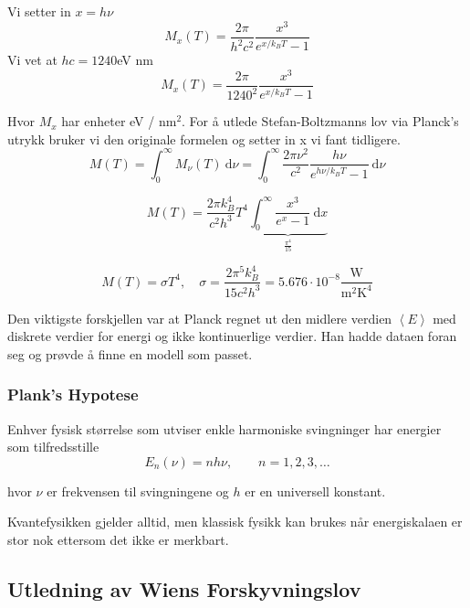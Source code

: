Vi setter in $x = hν$
\begin{equation}
M_{x}(T) = \frac{2π}{h^{2}c^{2}} \frac{x^{3}}{e^{x/k_{B}T} - 1}
\end{equation}
Vi vet at $hc = 1240 $eV nm 
\begin{equation}
M_{x}(T) = \frac{2π}{1240^{2}} \frac{x^{3}}{e^{x/k_{B}T} - 1}
\end{equation}

Hvor $M_{x}$ har enheter eV / nm$^{2}$. For å utlede Stefan-Boltzmanns lov via Planck's utrykk bruker vi den originale formelen og setter in x vi fant tidligere. 
\begin{equation}
M(T) = \int_{0}^{∞} M_{ν}(T) \ \mathrm{d}ν = \int_{0}^{∞} \frac{2πν^{2}}{c^{2}} \frac{hν}{e^{hν / k_{B}T} - 1} \ \mathrm{d}ν
\end{equation} 

\begin{equation}
M(T) = \frac{2πk^{4}_{B}}{c^{2}h^{3}}T^{4} \underbrace{\int_{0}^{∞} \frac{x^{3}}{e^{x} - 1} \ \mathrm{d}x}_{\frac{π^{4}}{15}}
\end{equation}

\begin{equation}
M(T) = σT^{4}, \quad σ = \frac{2π^{5}k^{4}_{B}}{15c^{2}h^{3}} = 5.676 ⋅ 10^{-8} \frac{\text{W}}{\text{m}^{2} \text{K}^{4}}
\end{equation}

Den viktigste forskjellen var at Planck regnet ut den midlere verdien $\left< E \right>$ med diskrete verdier for energi og ikke kontinuerlige verdier. Han hadde dataen foran seg og prøvde å finne en modell som passet. 

\subsubsection*{Plank's Hypotese}
Enhver fysisk størrelse som utviser enkle harmoniske svingninger har energier som tilfredsstille
\begin{equation}
E_n(ν) = nhν, \qquad n = 1, 2, 3, \dots
\end{equation}

hvor $ν$ er frekvensen til svingningene og $h$ er en universell konstant. 

Kvantefysikken gjelder alltid, men klassisk fysikk kan brukes når energiskalaen er stor nok ettersom det ikke er merkbart. 

\subsection{Utledning av Wiens Forskyvningslov}